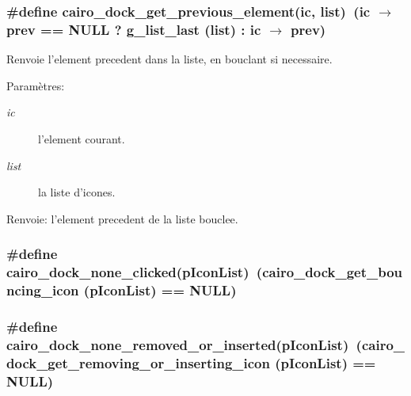 \subsubsection{\setlength{\rightskip}{0pt plus 5cm}\#define cairo\_\-dock\_\-get\_\-previous\_\-element(ic, list)~(ic $\rightarrow$ prev == NULL ? g\_\-list\_\-last (list) : ic $\rightarrow$ prev)}\label{cairo-dock-icons_8h_0340461148f53589f1caad5d96115336}


Renvoie l'element precedent dans la liste, en bouclant si necessaire. \begin{Desc}
\item[Paramètres:]
\begin{description}
\item[{\em ic}]l'element courant. \item[{\em list}]la liste d'icones. \end{description}
\end{Desc}
\begin{Desc}
\item[Renvoie:]l'element precedent de la liste bouclee. \end{Desc}
\subsubsection{\setlength{\rightskip}{0pt plus 5cm}\#define cairo\_\-dock\_\-none\_\-clicked(pIconList)~(cairo\_\-dock\_\-get\_\-bouncing\_\-icon (pIconList) == NULL)}\label{cairo-dock-icons_8h_e5282fefc988c2a65045550444344016}


\subsubsection{\setlength{\rightskip}{0pt plus 5cm}\#define cairo\_\-dock\_\-none\_\-removed\_\-or\_\-inserted(pIconList)~(cairo\_\-dock\_\-get\_\-removing\_\-or\_\-inserting\_\-icon (pIconList) == NULL)}\label{cairo-dock-icons_8h_2ac56d936096e5713e93f970ad3a985e}


